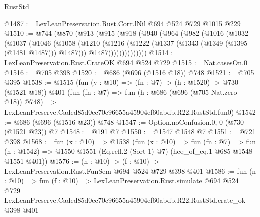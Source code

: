 \begin{lexlean}{RustStd}
\begin{coremodule}
@1487 := LexLeanPreservation.Rust.Corr.lNil @694 @524 @729 @1015 @229
@1510 := @744
    (@870
      (@913
        (@915
          (@918
            (@940
              (@964
                (@982
                  (@1016
                    (@1032
                      (@1037
                        (@1046
                          (@1058
                            (@1210
                              (@1216
                                (@1222 (@1337 (@1343 (@1349 (@1395 (@1481 @1487))) @1487)))
                                @1487))))))))))))))
@1514 := LexLeanPreservation.Rust.CrateOK @694 @524 @729
@1515 := Nat.casesOn.{0}
@1516 := @705 @398
@1520 := @686 (@696 (@1516 @18)) @748
@1521 := @705 @395
@1538 := @1515
    (fun (y : @10) => (fn : @7) -> (h : @1520) -> @730 (@1521 @18))
    @401
    (fun (fn : @7) =>
    fun (h : @686 (@696 (@705 Nat.zero @18)) @748) =>
    LexLeanPreserve.Caded85d0ec70c96655a45904ef60abdb.R22.RustStd.fun0)
@1542 := @686 (@696 (@1516 @23)) @748
@1547 := Option.noConfusion.{0, 0} (@730 (@1521 @23)) @7
@1548 := @191 @7
@1550 := @1547 @1548 @7
@1551 := @721 @398
@1568 := fun (x : @10) =>
  @1538
    (fun (x : @10) =>
    fun (fn : @7) =>
    fun (h : @1542) => @1550 @1551 (Eq.refl.{2} (Sort 1) @7) (heq_of_eq.{1} @685 @1548 @1551 @401))
@1576 := (n : @10) -> (f : @10) -> LexLeanPreservation.Rust.FunSem @694 @524 @729 @398 @401
@1586 := fun (n : @10) =>
  fun (f : @10) =>
  LexLeanPreservation.Rust.simulate
    @694
    @524
    @729
    LexLeanPreserve.Caded85d0ec70c96655a45904ef60abdb.R22.RustStd.crate_ok
    @398
    @401
\end{coremodule}
\end{lexlean}
